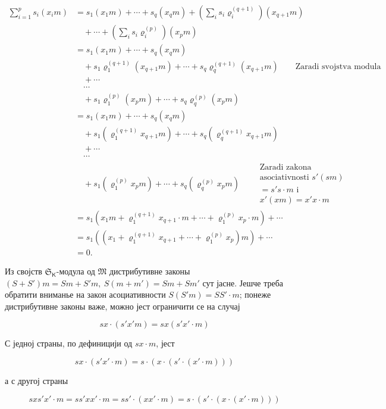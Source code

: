 \documentclass[11pt]{article}
\begin{document}
\[
\begin{aligned}
\sum_{i=1}^{p}s_i(x_i m)
&=s_1(x_1m)+\cdots+s_q(x_qm)
  +\left(\sum_i s_i\varrho_i^{(q+1)}\right)(x_{q+1}m)\\
&\quad+\cdots+\left(\sum_i s_i\varrho_i^{(p)}\right)(x_pm)\\
&=s_1(x_1m)+\cdots+s_q(x_qm)\\
&\quad+s_1\varrho_1^{(q+1)}(x_{q+1}m)+\cdots+s_q\varrho_q^{(q+1)}(x_{q+1}m)
  \qquad\text{Zaradi svojstva modula}\\
&\quad+\cdots\\
&\quad\cdots\\
&\quad+s_1\varrho_1^{(p)}(x_pm)+\cdots+s_q\varrho_q^{(p)}(x_pm)\\
&=s_1(x_1m)+\cdots+s_q(x_qm)\\
&\quad+s_1(\varrho_1^{(q+1)}x_{q+1}m)+\cdots+s_q(\varrho_q^{(q+1)}x_{q+1}m)\\
&\quad+\cdots\\
&\quad\cdots\\
&\quad+s_1(\varrho_1^{(p)}x_pm)+\cdots+s_q(\varrho_q^{(p)}x_pm)
  \qquad\begin{gathered}\text{Zaradi zakona}\\ \text{asociativnosti }s'(sm)\\ =s's\cdot m\text{ i}\\ x'(xm)=x'x\cdot m\end{gathered}\\
&=s_1\left(x_1m+\varrho_1^{(q+1)}x_{q+1}\cdot m+\cdots+\varrho_1^{(p)}x_p\cdot m\right)+\cdots\\
&=s_1\left(\left(x_1+\varrho_1^{(q+1)}x_{q+1}+\cdots+\varrho_1^{(p)}x_p\right)m\right)+\cdots\\
&=0.
\end{aligned}
\]


Из својств \(\mathfrak S_{\mathsf K}\)-модула од \(\mathfrak M\) дистрибутивне законы \((S+S')m=Sm+S'm,\ S(m+m')=Sm+Sm'\) сут јасне. Јешче треба обратити вниманье на закон асоциативности \(S(S'm)=SS'\cdot m\); понеже дистрибутивне законы важе, можно јест ограничити се на случај

\[
sx\cdot(s'x' m)=sx(s'x'\cdot m)
\]

С једној страны, по дефиницији од \(sx\cdot m\), јест

\[
sx\cdot(s'x'\cdot m)=s\cdot(x\cdot(s'\cdot(x'\cdot m)))
\]

а с другој страны

\[
sx s'x'\cdot m=ss'xx'\cdot m=ss'\cdot(xx'\cdot m)
=s\cdot(s'\cdot(x\cdot(x'\cdot m)))
\]
\end{document}
